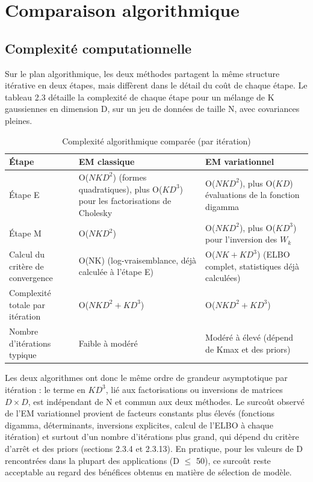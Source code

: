 \section{Comparaison algorithmique}
\subsection{Complexité computationnelle}
Sur le plan algorithmique, les deux méthodes partagent la même structure itérative en deux étapes, mais diffèrent dans le détail du coût de chaque étape. Le tableau 2.3 détaille la complexité de chaque étape pour un mélange de K gaussiennes en dimension D, sur un jeu de données de taille N, avec covariances pleines.

\begin{table}[H]
\centering
\small
\setlength{\tabcolsep}{0.14cm}
\begin{tabular}{|p{4.84cm}|p{4.84cm}|p{4.84cm}|}
\hline
\textbf{Étape} & \textbf{EM classique} & \textbf{EM variationnel} \\
\hline
Étape E & O($NKD^{2}$) (formes quadratiques), plus O($KD^{3}$) pour les factorisations de Cholesky & O($NKD^{2}$), plus O($KD$) évaluations de la fonction digamma \\
\hline
Étape M & O($NKD^{2}$) & O($NKD^{2}$), plus O($KD^{3}$) pour l'inversion des $W_{k}$ \\
\hline
Calcul du critère de convergence & O(NK) (log-vraisemblance, déjà calculée à l'étape E) & O($NK + KD^{3}$) (ELBO complet, statistiques déjà calculées) \\
\hline
Complexité totale par itération & O($NKD^{2} + KD^{3}$) & O($NKD^{2} + KD^{3}$) \\
\hline
Nombre d'itérations typique & Faible à modéré & Modéré à élevé (dépend de Kmax et des priors) \\
\hline
\end{tabular}
\caption{Complexité algorithmique comparée (par itération)}
\label{tab:2_3}
\end{table}
Les deux algorithmes ont donc le même ordre de grandeur asymptotique par itération : le terme en $KD^{3}$, lié aux factorisations ou inversions de matrices $D \times D$, est indépendant de N et commun aux deux méthodes. Le surcoût observé de l'EM variationnel provient de facteurs constants plus élevés (fonctions digamma, déterminants, inversions explicites, calcul de l'ELBO à chaque itération) et surtout d'un nombre d'itérations plus grand, qui dépend du critère d'arrêt et des priors (sections 2.3.4 et 2.3.13). En pratique, pour les valeurs de D rencontrées dans la plupart des applications (D $\leq $ 50), ce surcoût reste acceptable au regard des bénéfices obtenus en matière de sélection de modèle.

